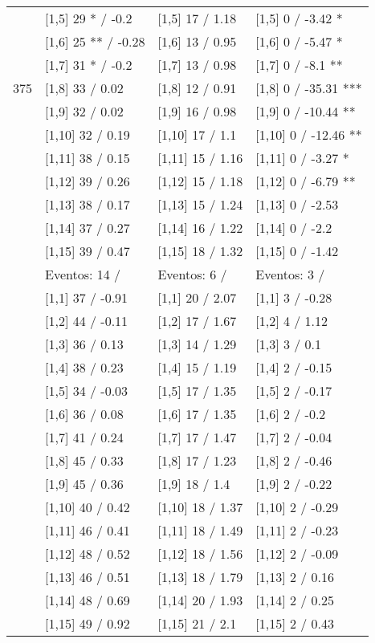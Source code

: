 \begin{table}
\begin{tabular}[t]{llll}
 & {}[1,5] 29 * / -0.2 & {}[1,5] 17  / 1.18 & {}[1,5] 0  / -3.42 *\\
 & {}[1,6] 25 ** / -0.28 & {}[1,6] 13  / 0.95 & {}[1,6] 0  / -5.47 *\\
 & {}[1,7] 31 * / -0.2 & {}[1,7] 13  / 0.98 & {}[1,7] 0  / -8.1 **\\
375 & {}[1,8] 33  / 0.02 & {}[1,8] 12  / 0.91 & {}[1,8] 0  / -35.31 ***\\
\addlinespace
 & {}[1,9] 32  / 0.02 & {}[1,9] 16  / 0.98 & {}[1,9] 0  / -10.44 **\\
 & {}[1,10] 32  / 0.19 & {}[1,10] 17  / 1.1 & {}[1,10] 0  / -12.46 **\\
 & {}[1,11] 38  / 0.15 & {}[1,11] 15  / 1.16 & {}[1,11] 0  / -3.27 *\\
 & {}[1,12] 39  / 0.26 & {}[1,12] 15  / 1.18 & {}[1,12] 0  / -6.79 **\\
 & {}[1,13] 38  / 0.17 & {}[1,13] 15  / 1.24 & {}[1,13] 0  / -2.53\\
\addlinespace
 & {}[1,14] 37  / 0.27 & {}[1,14] 16  / 1.22 & {}[1,14] 0  / -2.2\\
 & {}[1,15] 39  / 0.47 & {}[1,15] 18  / 1.32 & {}[1,15] 0  / -1.42\\
 & Eventos:  14 / & Eventos:  6 / & Eventos:  3 /\\
 & {}[1,1] 37  / -0.91 & {}[1,1] 20  / 2.07 & {}[1,1] 3  / -0.28\\
 & {}[1,2] 44  / -0.11 & {}[1,2] 17  / 1.67 & {}[1,2] 4  / 1.12\\
\addlinespace
 & {}[1,3] 36  / 0.13 & {}[1,3] 14  / 1.29 & {}[1,3] 3  / 0.1\\
 & {}[1,4] 38  / 0.23 & {}[1,4] 15  / 1.19 & {}[1,4] 2  / -0.15\\
 & {}[1,5] 34  / -0.03 & {}[1,5] 17  / 1.35 & {}[1,5] 2  / -0.17\\
 & {}[1,6] 36  / 0.08 & {}[1,6] 17  / 1.35 & {}[1,6] 2  / -0.2\\
 & {}[1,7] 41  / 0.24 & {}[1,7] 17  / 1.47 & {}[1,7] 2  / -0.04\\
\addlinespace
500 & {}[1,8] 45  / 0.33 & {}[1,8] 17  / 1.23 & {}[1,8] 2  / -0.46\\
 & {}[1,9] 45  / 0.36 & {}[1,9] 18  / 1.4 & {}[1,9] 2  / -0.22\\
 & {}[1,10] 40  / 0.42 & {}[1,10] 18  / 1.37 & {}[1,10] 2  / -0.29\\
 & {}[1,11] 46  / 0.41 & {}[1,11] 18  / 1.49 & {}[1,11] 2  / -0.23\\
 & {}[1,12] 48  / 0.52 & {}[1,12] 18  / 1.56 & {}[1,12] 2  / -0.09\\
\addlinespace
 & {}[1,13] 46  / 0.51 & {}[1,13] 18  / 1.79 & {}[1,13] 2  / 0.16\\
 & {}[1,14] 48  / 0.69 & {}[1,14] 20  / 1.93 & {}[1,14] 2  / 0.25\\
 & {}[1,15] 49  / 0.92 & {}[1,15] 21  / 2.1 & {}[1,15] 2  / 0.43\\
\bottomrule
\end{tabular}
\end{table}
